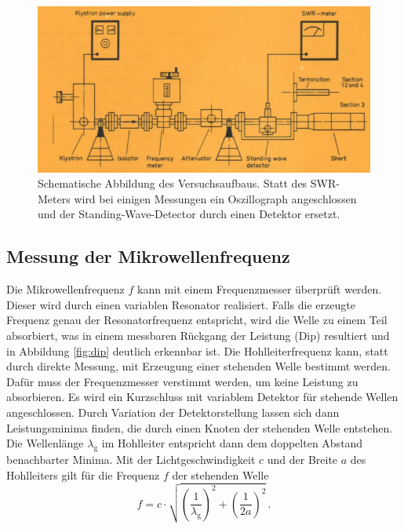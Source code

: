 \begin{figure}[p]
    \centering
    \includegraphics[width=0.8\linewidth]{img/aufbau_microwave.png}
    \caption{
        Schematische Abbildung des Versuchsaufbaus. Statt des
        SWR-Meters wird bei einigen Messungen ein Oszillograph angeschlossen
        und der Standing-Wave-Detector durch einen Detektor ersetzt.
    }
    \label{fig:aufbau_microwave}
\end{figure}

\subsection{Messung der Mikrowellenfrequenz}
\label{subsec:messung}
Die Mikrowellenfrequenz $f$ kann mit einem Frequenzmesser überprüft werden.
Dieser wird durch einen variablen Resonator realisiert. Falls die
erzeugte Frequenz genau der Resonatorfrequenz entspricht, wird die Welle zu
einem Teil absorbiert, was in einem messbaren Rückgang der Leistung (Dip)
resultiert und in Abbildung \ref{fig:dip} deutlich erkennbar ist.
Die Hohlleiterfrequenz kann, statt durch
direkte Messung, mit Erzeugung einer stehenden Welle bestimmt werden.
Dafür muss der Frequenzmesser verstimmt werden, um keine Leistung zu
absorbieren.
Es wird ein Kurzschluss mit variablem Detektor für stehende Wellen
angeschlossen.
Durch Variation der Detektorstellung lassen sich dann Leistungsminima finden,
die durch einen Knoten der stehenden Welle entstehen.
Die Wellenlänge $\lambda_\text{g}$ im Hohlleiter entspricht dann dem doppelten
Abstand benachbarter Minima. Mit der Lichtgeschwindigkeit $c$
und der Breite $a$ des Hohlleiters gilt für die Frequenz $f$ der stehenden
Welle
\begin{equation}
    \label{frequenz}
    f = c\cdot\sqrt{\left(\frac{1}{\lambda_\text{g}}\right)^2 + \left(\frac{1}{2a}\right)^2} \,.
\end{equation}


